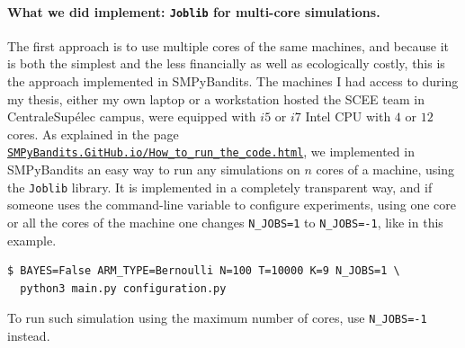 {\paragraph{What we did implement: \texttt{Joblib} for multi-core simulations.}
%
The first approach is to use multiple cores of the same machines, and because it is both the simplest and the less financially as well as ecologically costly, this is the approach implemented in SMPyBandits.
The machines I had access to during my thesis, either my own laptop or a workstation hosted the SCEE team in CentraleSupélec campus, were equipped with $i5$ or $i7$ Intel CPU with $4$ or $12$ cores.
%
As explained in the page \href{https://smpybandits.github.io/How_to_run_the_code.html}{\texttt{SMPyBandits.GitHub.io/How\_to\_run\_the\_code.html}}, we implemented in SMPyBandits an easy way to run any simulations on $n$ cores of a machine, using the \texttt{Joblib} \cite{joblib} library.
It is implemented in a completely transparent way, and if someone uses the command-line variable to configure experiments, using one core or all the cores of the machine one changes \texttt{N\_JOBS=1} to \texttt{N\_JOBS=-1}, like in this example.

\begin{small}
    \begin{listing}[h!]
        \begin{verbatim}
$ BAYES=False ARM_TYPE=Bernoulli N=100 T=10000 K=9 N_JOBS=1 \
  python3 main.py configuration.py
        \end{verbatim}
        \caption{To run such simulation using the maximum number of cores, use \texttt{N\_JOBS=-1} instead.}
        \label{lst:3:runOneCoreOrMore}
    \end{listing}
\end{small}

}
